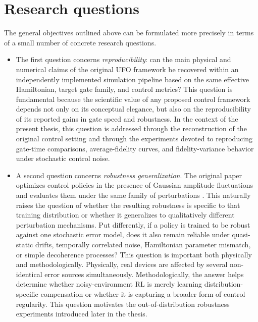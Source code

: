 \section{Research questions}
\label{subsec:intro_research_questions}
The general objectives outlined above can be formulated more precisely in terms of a small number of concrete research questions. 
\begin{itemize}
    \item The first question concerns \emph{reproducibility}: can the main physical and numerical claims of the original UFO framework be recovered within an independently implemented simulation pipeline based on the same effective Hamiltonian, target gate family, and control metrics? This question is fundamental because the scientific value of any proposed control framework depends not only on its conceptual elegance, but also on the reproducibility of its reported gains in gate speed and robustness. In the context of the present thesis, this question is addressed through the reconstruction of the original control setting and through the experiments devoted to reproducing gate-time comparisons, average-fidelity curves, and fidelity-variance behavior under stochastic control noise.

    \item A second question concerns \emph{robustness generalization}. The original paper optimizes control policies in the presence of Gaussian amplitude fluctuations and evaluates them under the same family of perturbations \cite{Niu2019}. This naturally raises the question of whether the resulting robustness is specific to that training distribution or whether it generalizes to qualitatively different perturbation mechanisms. Put differently, if a policy is trained to be robust against one stochastic error model, does it also remain reliable under quasi-static drifts, temporally correlated noise, Hamiltonian parameter mismatch, or simple decoherence processes? This question is important both physically and methodologically. Physically, real devices are affected by several non-identical error sources simultaneously. Methodologically, the answer helps determine whether noisy-environment RL is merely learning distribution-specific compensation or whether it is capturing a broader form of control regularity. This question motivates the out-of-distribution robustness experiments introduced later in the thesis.


\end{itemize}
